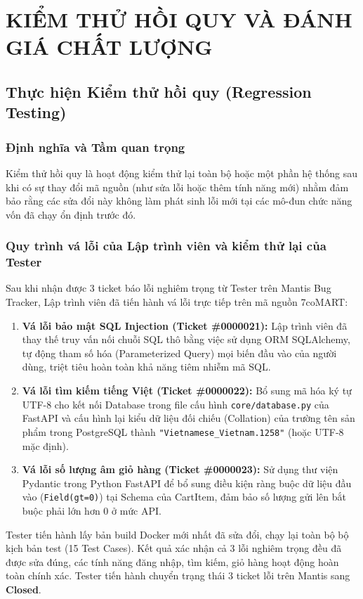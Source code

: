 \chapter{KIỂM THỬ HỒI QUY VÀ ĐÁNH GIÁ CHẤT LƯỢNG}

\section{Thực hiện Kiểm thử hồi quy (Regression Testing)}

\subsection{Định nghĩa và Tầm quan trọng}
Kiểm thử hồi quy là hoạt động kiểm thử lại toàn bộ hoặc một phần hệ thống sau khi có sự thay đổi mã nguồn (như sửa lỗi hoặc thêm tính năng mới) nhằm đảm bảo rằng các sửa đổi này không làm phát sinh lỗi mới tại các mô-đun chức năng vốn đã chạy ổn định trước đó.

\subsection{Quy trình vá lỗi của Lập trình viên và kiểm thử lại của Tester}
Sau khi nhận được 3 ticket báo lỗi nghiêm trọng từ Tester trên Mantis Bug Tracker, Lập trình viên đã tiến hành vá lỗi trực tiếp trên mã nguồn 7coMART:
\begin{enumerate}
    \item \textbf{Vá lỗi bảo mật SQL Injection (Ticket \#0000021):} Lập trình viên đã thay thế truy vấn nối chuỗi SQL thô bằng việc sử dụng ORM SQLAlchemy, tự động tham số hóa (Parameterized Query) mọi biến đầu vào của người dùng, triệt tiêu hoàn toàn khả năng tiêm nhiễm mã SQL.
    \item \textbf{Vá lỗi tìm kiếm tiếng Việt (Ticket \#0000022):} Bổ sung mã hóa ký tự UTF-8 cho kết nối Database trong file cấu hình \texttt{core/database.py} của FastAPI và cấu hình lại kiểu dữ liệu đối chiếu (Collation) của trường tên sản phẩm trong PostgreSQL thành \texttt{"Vietnamese\_Vietnam.1258"} (hoặc UTF-8 mặc định).
    \item \textbf{Vá lỗi số lượng âm giỏ hàng (Ticket \#0000023):} Sử dụng thư viện Pydantic trong Python FastAPI để bổ sung điều kiện ràng buộc dữ liệu đầu vào (\texttt{Field(gt=0)}) tại Schema của CartItem, đảm bảo số lượng gửi lên bắt buộc phải lớn hơn 0 ở mức API.
\end{enumerate}
Tester tiến hành lấy bản build Docker mới nhất đã sửa đổi, chạy lại toàn bộ bộ kịch bản test (15 Test Cases). Kết quả xác nhận cả 3 lỗi nghiêm trọng đều đã được sửa đúng, các tính năng đăng nhập, tìm kiếm, giỏ hàng hoạt động hoàn toàn chính xác. Tester tiến hành chuyển trạng thái 3 ticket lỗi trên Mantis sang \textbf{Closed}.

